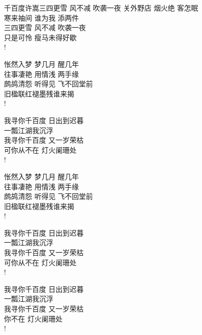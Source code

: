 \begin{poem}{千百度}{许嵩}{三四更雪 风不减 吹袭一夜}
关外野店 烟火绝 客怎眠\\
寒来袖间 谁为我 添两件\\
三四更雪 风不减 吹袭一夜\\
只是可怜 瘦马未得好歇\\!

怅然入梦 梦几月 醒几年 \\
往事凄艳 用情浅 两手缘 \\
鹧鸪清怨 听得见 飞不回堂前 \\
旧楹联红褪墨残谁来揭 \\!

我寻你千百度 日出到迟暮 \\
一瓢江湖我沉浮 \\
我寻你千百度 又一岁荣枯 \\
可你从不在 灯火阑珊处 \\!

怅然入梦 梦几月 醒几年 \\
往事凄艳 用情浅 两手缘 \\
鹧鸪清怨 听得见 飞不回堂前 \\
旧楹联红褪墨残谁来揭 \\!

我寻你千百度 日出到迟暮 \\
一瓢江湖我沉浮 \\
我寻你千百度 又一岁荣枯 \\
可你从不在 灯火阑珊处 \\!

我寻你千百度 日出到迟暮 \\
一瓢江湖我沉浮 \\
我寻你千百度 又一岁荣枯 \\
你不在 灯火阑珊处 \\!
\end{poem}
